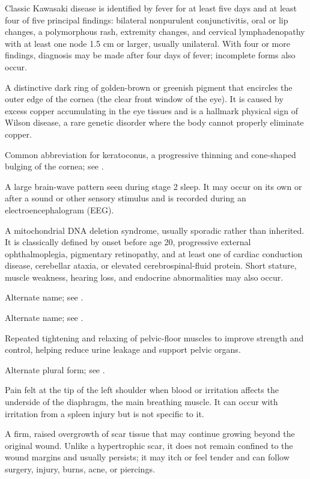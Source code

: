  Classic Kawasaki disease is identified by fever
for at least five days and at least four of five principal findings: bilateral nonpurulent
conjunctivitis, oral or lip changes, a polymorphous rash, extremity changes, and cervical
lymphadenopathy with at least one node 1.5 cm or larger, usually unilateral. With four or
more findings, diagnosis may be made after four days of fever; incomplete forms also occur.

 A distinctive dark ring of golden-brown or greenish pigment that encircles the outer edge of the cornea (the clear front window of the eye). It is caused by excess copper accumulating in the eye tissues and is a hallmark physical sign of Wilson disease, a rare genetic disorder where the body cannot properly eliminate copper.

 Common abbreviation for keratoconus, a progressive thinning and cone-shaped bulging of the cornea; see .

 A large brain-wave pattern seen during stage 2 sleep. It may occur on its own or after a sound or other sensory stimulus and is recorded during an electroencephalogram (EEG).

 A mitochondrial DNA deletion syndrome, usually sporadic
rather than inherited. It is classically defined by onset before age 20, progressive external
ophthalmoplegia, pigmentary retinopathy, and at least one of cardiac conduction disease,
cerebellar ataxia, or elevated cerebrospinal-fluid protein. Short stature, muscle weakness,
hearing loss, and endocrine abnormalities may also occur.

 Alternate name; see .

 Alternate name; see .

 Repeated tightening and relaxing of pelvic-floor muscles to improve strength and control, helping reduce urine leakage and support pelvic organs.

 Alternate plural form; see .

 Pain felt at the tip of the left shoulder when blood or irritation affects the underside of the diaphragm, the main breathing muscle. It can occur with irritation from a spleen injury but is not specific to it.

 A firm, raised overgrowth of scar tissue that may continue growing beyond the original wound. Unlike a hypertrophic scar, it does not remain confined to the wound margins and usually persists; it may itch or feel tender and can follow surgery, injury, burns, acne, or piercings.

